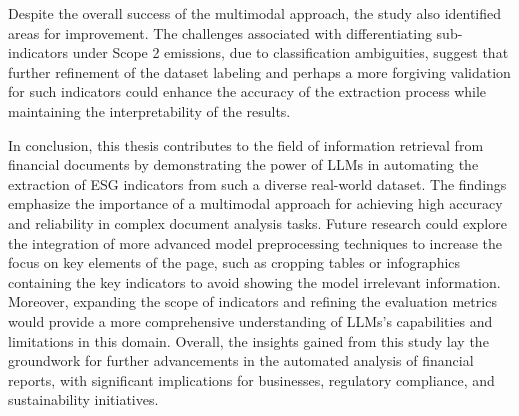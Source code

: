 \documentclass[english, 12pt, a4paper, elec, utf8, a-2b, online]{aaltothesis}
\begin{document}
Despite the overall success of the multimodal approach, the study also identified areas for improvement.
The challenges associated with differentiating sub-indicators under Scope 2 emissions, due to classification ambiguities, suggest that further refinement of the dataset labeling and perhaps a more forgiving validation for such indicators could enhance the accuracy of the extraction process while maintaining the interpretability of the results.

In conclusion, this thesis contributes to the field of information retrieval from financial documents by demonstrating the power of \acp{LLM} in automating the extraction of \ac{ESG} indicators from such a diverse real-world dataset.
The findings emphasize the importance of a multimodal approach for achieving high accuracy and reliability in complex document analysis tasks.
Future research could explore the integration of more advanced model preprocessing techniques to increase the focus on key elements of the page, such as cropping tables or infographics containing the key indicators to avoid showing the model irrelevant information. Moreover, expanding the scope of indicators and refining the evaluation metrics would provide a more comprehensive understanding of \acp{LLM}'s capabilities and limitations in this domain.
Overall, the insights gained from this study lay the groundwork for further advancements in the automated analysis of financial reports, with significant implications for businesses, regulatory compliance, and sustainability initiatives.

\clearpage
\thesisbibliography






\end{document}
